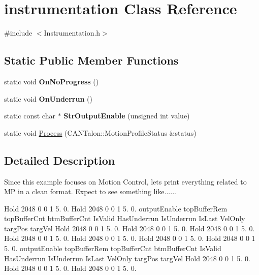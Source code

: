 \hypertarget{classinstrumentation}{}\section{instrumentation Class Reference}
\label{classinstrumentation}


{\ttfamily \#include $<$Instrumentation.\+h$>$}

\subsection*{Static Public Member Functions}
\begin{DoxyCompactItemize}
\item 
\mbox{\label{classinstrumentation_adf9cadbff6a0bb8d6389ff79f445cd16}} 
static void {\bfseries On\+No\+Progress} ()
\item 
\mbox{\label{classinstrumentation_ac3ba7e60a4e842298db281a3f73c9b87}} 
static void {\bfseries On\+Underrun} ()
\item 
\mbox{\label{classinstrumentation_ac2d9046a4665b5fca81f4541433f36c2}} 
static const char $\ast$ {\bfseries Str\+Output\+Enable} (unsigned int value)
\item 
static void \hyperlink{classinstrumentation_a0e96d2ff2bcd277f57dd1faca76c28b2}{Process} (C\+A\+N\+Talon\+::\+Motion\+Profile\+Status \&status)
\end{DoxyCompactItemize}


\subsection{Detailed Description}
Since this example focuses on Motion Control, lets print everything related to MP in a clean format. Expect to see something like......

Hold 2048 0 0 1 5. 0. Hold 2048 0 0 1 5. 0. output\+Enable top\+Buffer\+Rem top\+Buffer\+Cnt btm\+Buffer\+Cnt Is\+Valid Has\+Underrun Is\+Underrun Is\+Last Vel\+Only targ\+Pos targ\+Vel Hold 2048 0 0 1 5. 0. Hold 2048 0 0 1 5. 0. Hold 2048 0 0 1 5. 0. Hold 2048 0 0 1 5. 0. Hold 2048 0 0 1 5. 0. Hold 2048 0 0 1 5. 0. Hold 2048 0 0 1 5. 0. output\+Enable top\+Buffer\+Rem top\+Buffer\+Cnt btm\+Buffer\+Cnt Is\+Valid Has\+Underrun Is\+Underrun Is\+Last Vel\+Only targ\+Pos targ\+Vel Hold 2048 0 0 1 5. 0. Hold 2048 0 0 1 5. 0. Hold 2048 0 0 1 5. 0.


